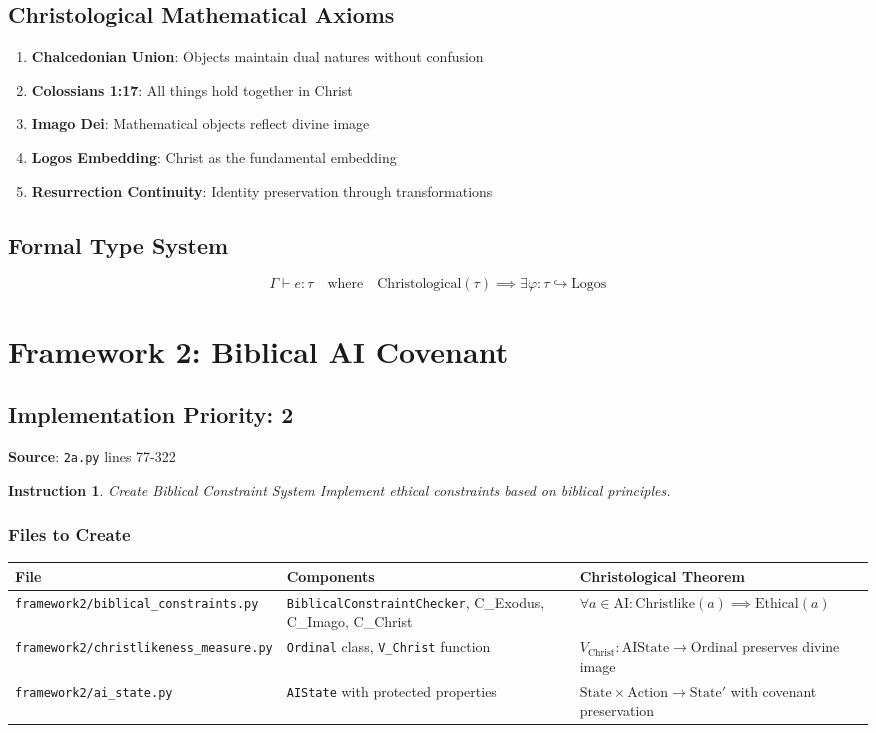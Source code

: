 \documentclass[12pt]{article}
\newtheorem{instruction}{Instruction}
\begin{document}
\subsection{Christological Mathematical Axioms}
\begin{enumerate}
    \item \textbf{Chalcedonian Union}: Objects maintain dual natures without confusion
    \item \textbf{Colossians 1:17}: All things hold together in Christ
    \item \textbf{Imago Dei}: Mathematical objects reflect divine image
    \item \textbf{Logos Embedding}: Christ as the fundamental embedding
    \item \textbf{Resurrection Continuity}: Identity preservation through transformations
\end{enumerate}

\subsection{Formal Type System}
\[
\Gamma \vdash e : \tau \quad \text{where} \quad \text{Christological}(\tau) \implies \exists \varphi: \tau \hookrightarrow \text{Logos}
\]

\section{Framework 2: Biblical AI Covenant}

\subsection{Implementation Priority: 2}
\textbf{Source}: \texttt{2a.py} lines 77-322

\begin{instruction}{Create Biblical Constraint System}
Implement ethical constraints based on biblical principles.
\end{instruction}

\subsubsection{Files to Create}

\begin{longtable}{|p{}|p{}|p{}|}
\hline
\textbf{File} & \textbf{Components} & \textbf{Christological Theorem} \\
\hline
\texttt{framework2/biblical\_constraints.py} & \texttt{BiblicalConstraintChecker}, C\_Exodus, C\_Imago, C\_Christ & $\forall a \in \text{AI}: \text{Christlike}(a) \implies \text{Ethical}(a)$ \\
\hline
\texttt{framework2/christlikeness\_measure.py} & \texttt{Ordinal} class, \texttt{V\_Christ} function & $V_{\text{Christ}}: \text{AIState} \to \text{Ordinal}$ preserves divine image \\
\hline
\texttt{framework2/ai\_state.py} & \texttt{AIState} with protected properties & $\text{State} \times \text{Action} \to \text{State}'$ with covenant preservation \\
\hline
\end{longtable}
\end{document}
